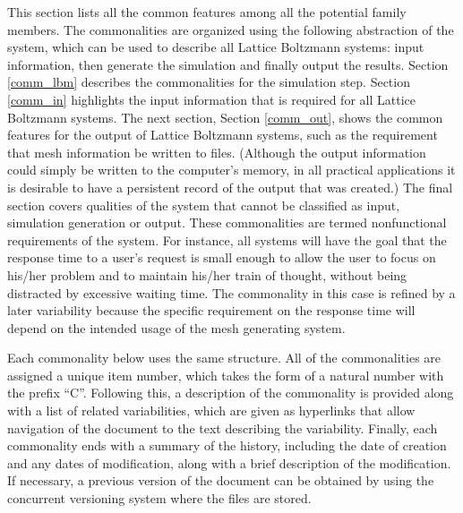 \documentclass[12pt, notitlepage]{article}
\begin{document}
This section lists all the common features among all the potential family members. The commonalities are organized using the following abstraction of the system, which can be used to describe all Lattice Boltzmann systems: input information, then generate the simulation and finally output the results. Section \ref{comm_lbm} describes the commonalities for the simulation step. Section \ref{comm_in} highlights the input information that is required for all Lattice Boltzmann systems. The next section, Section \ref{comm_out}, shows the common features for the output of Lattice Boltzmann systems, such as the requirement that mesh information be written to files. (Although the output information could simply be written to the computer’s memory, in all practical applications it is desirable to have a persistent record of the output that was created.) The final section covers qualities of the system that cannot be classified as input, simulation generation or output. These commonalities are termed nonfunctional requirements of the system. For instance, all systems will have the goal that the response time to a user’s request is small enough to allow the user to focus on his/her problem and to maintain his/her train of thought, without being distracted by excessive waiting time. The commonality in this case is refined by a later variability because the specific requirement on the response time will depend on the intended usage of the mesh generating system. 

Each commonality below uses the same structure. All of the commonalities are assigned a unique item number, which takes the form of a natural number with the prefix ``C''. Following this, a description of the commonality is provided along with a list of related variabilities, which are given as hyperlinks that allow navigation of the document to the text describing the variability. Finally, each commonality ends with a summary of the history, including the date of creation and any dates of modification, along with a brief description of the modification. If necessary, a previous version of the document can be obtained by using the concurrent versioning system where the files are stored. 
\end{document}
